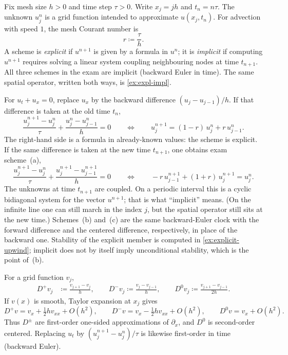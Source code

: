\documentclass[11pt,a4paper]{article}
\begin{document}
\begin{notation}
\label{not:grid-p4}
Fix mesh size \(h>0\) and time step \(\tau>0\). Write \(x_j=jh\) and \(t_n=n\tau\). The unknown \(u_j^n\) is a grid function intended to approximate \(u(x_j,t_n)\). For advection with speed \(1\), the mesh Courant number is
\[
r
\coloneqq
\frac{\tau}{h}.
\]
A scheme is \emph{explicit} if \(u^{n+1}\) is given by a formula in \(u^n\); it is \emph{implicit} if computing \(u^{n+1}\) requires solving a linear system coupling neighbouring nodes at time \(t_{n+1}\). All three schemes in the exam are implicit (backward Euler in time). The same spatial operator, written both ways, is \cref{ex:expl-impl}.
\end{notation}

\begin{example}
\label{ex:expl-impl}
For \(u_t+u_x=0\), replace \(u_x\) by the backward difference \((u_j-u_{j-1})/h\). If that difference is taken at the old time \(t_n\),
\[
\frac{u_j^{n+1}-u_j^n}{\tau}
+
\frac{u_j^n-u_{j-1}^n}{h}
=0
\qquad\Longleftrightarrow\qquad
u_j^{n+1}
=
(1-r)\,u_j^n
+
r\,u_{j-1}^n.
\]
The right-hand side is a formula in already-known values: the scheme is explicit. If the same difference is taken at the new time \(t_{n+1}\), one obtains exam scheme~(a),
\[
\frac{u_j^{n+1}-u_j^n}{\tau}
+
\frac{u_j^{n+1}-u_{j-1}^{n+1}}{h}
=0
\qquad\Longleftrightarrow\qquad
-r\,u_{j-1}^{n+1}
+
(1+r)\,u_j^{n+1}
=
u_j^n.
\]
The unknowns at time \(t_{n+1}\) are coupled. On a periodic interval this is a cyclic bidiagonal system for the vector \(u^{n+1}\); that is what ``implicit'' means. (On the infinite line one can still march in the index \(j\), but the spatial operator still sits at the new time.) Schemes~(b) and~(c) are the same backward-Euler clock with the forward difference and the centered difference, respectively, in place of the backward one. Stability of the explicit member is computed in \cref{ex:explicit-upwind}; implicit does not by itself imply unconditional stability, which is the point of~(b).
\end{example}

\begin{definition}
\label{def:quotients}
For a grid function \(v_j\),
\begin{align*}
D^+v_j
&\coloneqq
\frac{v_{j+1}-v_j}{h},
\qquad
D^-v_j
\coloneqq
\frac{v_j-v_{j-1}}{h},
\qquad
D^0v_j
\coloneqq
\frac{v_{j+1}-v_{j-1}}{2h}.
\end{align*}
If \(v(x)\) is smooth, Taylor expansion at \(x_j\) gives
\[
D^+v=v_x+\tfrac12 h v_{xx}+O(h^2),\qquad
D^-v=v_x-\tfrac12 h v_{xx}+O(h^2),\qquad
D^0v=v_x+O(h^2).
\]
Thus \(D^\pm\) are first-order one-sided approximations of \(\partial_x\), and \(D^0\) is second-order centered. Replacing \(u_t\) by \((u_j^{n+1}-u_j^n)/\tau\) is likewise first-order in time (backward Euler).
\end{definition}
\end{document}
